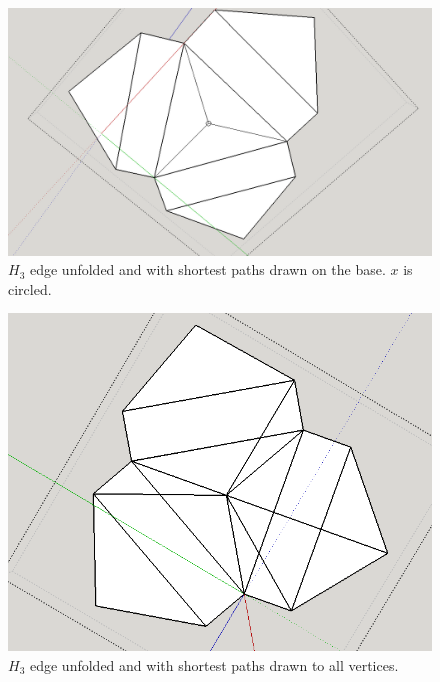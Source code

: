 \documentclass[12 pt]{article}
\begin{document}
\begin{figure}[h]
\caption{$H_3$ edge unfolded and with shortest paths drawn on the base. $x$ is circled.}
\centering
\includegraphics[scale=0.25]{starUnfolding/h3SpanningOne.png}
\end{figure}

\begin{figure}[h]
\caption{$H_3$ edge unfolded and with shortest paths drawn to all vertices. }
\centering
\includegraphics[scale=0.25]{starUnfolding/h3Spanning.png}
\end{figure}



\end{document}
